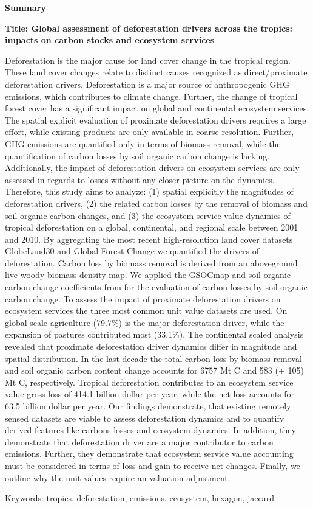 \thispagestyle{empty}

\begin{center}
	\textbf{Summary}
\end{center}
	\textbf{Title: Global assessment of deforestation drivers across the tropics: impacts on carbon stocks and ecosystem services}

	Deforestation is the major cause for land cover change in the tropical region. These land cover changes relate to distinct causes recognized as direct/proximate deforestation drivers. Deforestation is a major source of anthropogenic \ac{GHG} emissions, which contributes to climate change. Further, the change of tropical forest cover has a significant impact on global and continental ecosystem services. The spatial explicit evaluation of proximate deforestation drivers requires a large effort, while existing products are only available in coarse resolution. Further, \ac{GHG} emissions are quantified only in terms of biomass removal, while the quantification of carbon losses by soil organic carbon change is lacking. Additionally, the impact of deforestation drivers on ecosystem services are only assessed in regards to losses without any closer picture on the dynamics. Therefore, this study aims to analyze: (1) spatial explicitly the magnitudes of deforestation drivers, (2) the related carbon losses by the removal of biomass and soil organic carbon changes, and (3) the ecosystem service value dynamics of tropical deforestation on a global, continental, and regional scale between 2001 and 2010. By aggregating the most recent high-resolution land cover datasets GlobeLand30 and Global Forest Change we quantified the drivers of deforestation. Carbon loss by biomass removal is derived from an aboveground live woody biomass density map. We applied the GSOCmap and soil organic carbon change coefficients from \citet{Don2010} for the evaluation of carbon losses by soil organic carbon change. To assess the impact of proximate deforestation drivers on ecosystem services the three most common unit value datasets are used. On global scale agriculture (79.7\%) is the major deforestation driver, while the expansion of pastures contributed most (33.1\%). The continental scaled analysis revealed that proximate deforestation driver dynamics differ in magnitude and spatial distribution. In the last decade the total carbon loss by biomass removal and soil organic carbon content change accounts for 6757 Mt C and 583 ($\pm$ 105) Mt C, respectively. Tropical deforestation contributes to an ecosystem service value gross loss of 414.1 billion dollar per year, while the net loss accounts for 63.5 billion dollar per year. 
	Our findings demonstrate, that existing remotely sensed datasets are viable to assess deforestation dynamics and to quantify derived features like carbons losses and ecosystem dynamics. In addition, they demonstrate that deforestation driver are a major contributor to carbon emissions. Further, they demonstrate that ecosystem service value accounting must be considered in terms of loss and gain to receive net changes. Finally, we outline why the unit values require an valuation adjustment.

	Keywords: tropics, deforestation, emissions, ecosystem, hexagon, jaccard